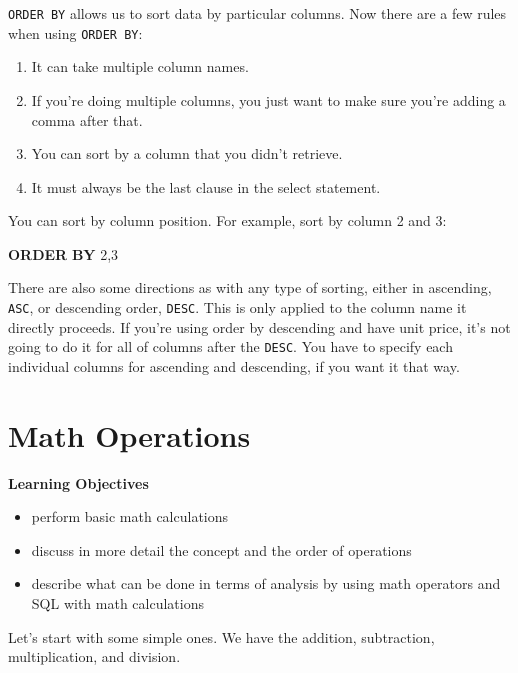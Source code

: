 \documentclass[]{book}
\newenvironment{Shaded}{\begin{snugshade}}{\end{snugshade}}
\newcommand{\KeywordTok}[1]{\textcolor[rgb]{0.13,0.29,0.53}{\textbf{{#1}}}}
\newcommand{\DecValTok}[1]{\textcolor[rgb]{0.00,0.00,0.81}{{#1}}}
\newcommand{\NormalTok}[1]{{#1}}
\providecommand{\tightlist}{%
  \setlength{\itemsep}{0pt}\setlength{\parskip}{0pt}}
\theoremstyle{definition}
\theoremstyle{definition}
\theoremstyle{remark}
\begin{document}
\texttt{ORDER\ BY} allows us to sort data by particular columns. Now
there are a few rules when using \texttt{ORDER\ BY}:

\begin{enumerate}
\def\labelenumi{\arabic{enumi}.}
\tightlist
\item
  It can take multiple column names.
\item
  If you're doing multiple columns, you just want to make sure you're
  adding a comma after that.
\item
  You can sort by a column that you didn't retrieve.
\item
  It must always be the last clause in the select statement.
\end{enumerate}

You can sort by column position. For example, sort by column 2 and 3:

\begin{Shaded}
\begin{Highlighting}[]
\KeywordTok{ORDER} \KeywordTok{BY} \DecValTok{2}\NormalTok{,}\DecValTok{3}
\end{Highlighting}
\end{Shaded}

There are also some directions as with any type of sorting, either in
ascending, \texttt{ASC}, or descending order, \texttt{DESC}. This is
only applied to the column name it directly proceeds. If you're using
order by descending and have unit price, it's not going to do it for all
of columns after the \texttt{DESC}. You have to specify each individual
columns for ascending and descending, if you want it that way.

\section{Math Operations}\label{math-operations}

\textbf{Learning Objectives}

\begin{itemize}
\tightlist
\item
  perform basic math calculations
\item
  discuss in more detail the concept and the order of operations
\item
  describe what can be done in terms of analysis by using math operators
  and SQL with math calculations
\end{itemize}

Let's start with some simple ones. We have the addition, subtraction,
multiplication, and division.
\end{document}
